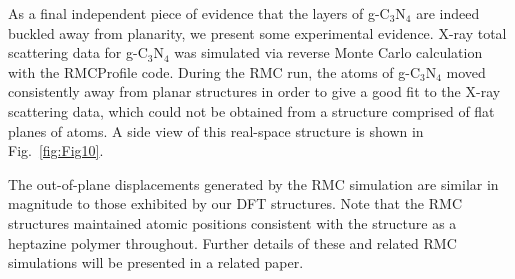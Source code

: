 As a final independent piece of evidence that the layers of g-C$_3$N$_4$ are indeed buckled away from planarity, we present some experimental evidence.  X-ray total scattering data for g-C$_3$N$_4$ was simulated via reverse Monte Carlo calculation with the RMCProfile code.\cite{Tucker2007RMCProfile:Materials, Liu2025HarnessingCapacitors}
During the RMC run, the atoms of g-C$_3$N$_4$ moved consistently away from planar structures in order to give a good fit to the X-ray scattering data, which could not be obtained from a structure comprised of flat planes of atoms.  A side view of this real-space structure is shown in Fig.\ \ref{fig:Fig10}.  

The out-of-plane displacements generated by the RMC simulation are similar in magnitude to those exhibited by our DFT structures.  Note that the RMC structures maintained atomic positions consistent with the structure as a heptazine polymer throughout.
Further details of these and related RMC simulations will be presented in a related paper. \cite{Adnan2026atomicallycoordinatednonmetal}



